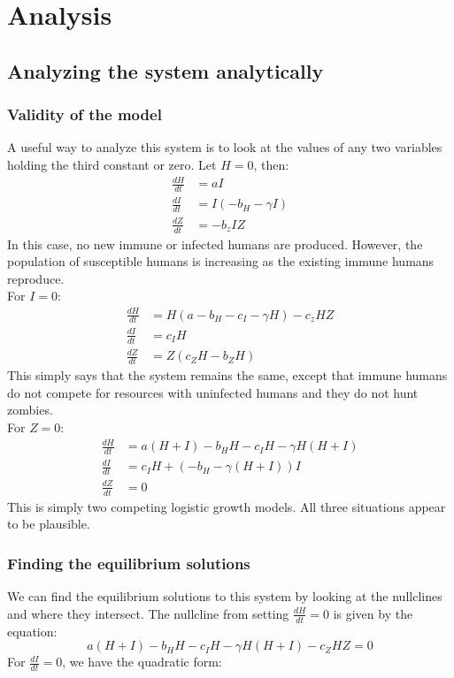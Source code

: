 \documentclass[
	12pt
]{article}
\begin{document}
\section{Analysis}
	\subsection{Analyzing the system analytically}
		\subsubsection{Validity of the model}
			A useful way to analyze this system is to look at the values of any two variables holding the third constant or zero.
			Let $H= 0$, then:
			\begin{align*}
				\frac{dH}{dt} &=aI\\
				\frac{dI}{dt} &= I(-b_H-\gamma I)\\
				\frac{dZ}{dt} &= -b_z IZ
			\end{align*}
			In this case, no new immune or infected humans are produced. However, the population of susceptible humans is increasing as the existing immune humans reproduce. \\
			For $I=0$:
			\begin{align*}
				\frac{dH}{dt} &= H(a-b_H-c_I-\gamma H)-c_z HZ\\
				\frac{dI}{dt} &= c_IH\\
				\frac{dZ}{dt} &= Z(c_ZH-b_ZH)
			\end{align*}	
			This simply says that the system remains the same, except that immune humans do not compete for resources with uninfected humans and they do not hunt zombies.\\
			For $Z=0$:
			\begin{align*}
				\frac{dH}{dt} &= a(H+I)-b_HH-c_IH-\gamma H(H+I)\\
				\frac{dI}{dt} &= c_IH+(-b_H-\gamma(H+I))I \\
				\frac{dZ}{dt} &= 0
			\end{align*}
			This is simply two competing logistic growth models. All three situations appear to be plausible.
		\subsubsection{Finding the equilibrium solutions}
We can find the equilibrium solutions to this system by looking at the nullclines and where they intersect. The nullcline from setting $\frac{dH}{dt}=0$ is given by the equation:
\begin{equation}
a(H+I)-b_HH-c_IH-\gamma H(H+I)-c_ZHZ=0
\end{equation}
For $\frac{dI}{dt}=0$, we have the quadratic form:
\end{document}
